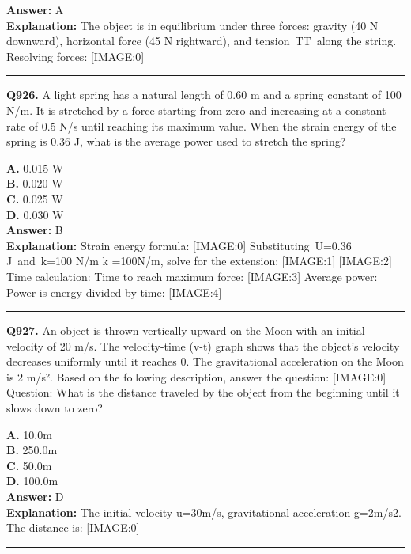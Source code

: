 \documentclass[12pt]{article}
\begin{document}
\textbf{Answer:} A \\
\textbf{Explanation:} The object is in equilibrium under three forces: gravity (40 N downward), horizontal force (45 N rightward), and tension TT along the string. Resolving forces:
[IMAGE:0]

\hrule
\vspace{1em}


\noindent
\textbf{Q926.} A light spring has a natural length of 0.60 m and a spring constant of 100 N/m. It is stretched by a force starting from zero and increasing at a constant rate of 0.5 N/s until reaching its maximum value. When the strain energy of the spring is 0.36 J, what is the average power used to stretch the spring?



\textbf{A.} 0.015 W \\
\textbf{B.} 0.020 W \\
\textbf{C.} 0.025 W \\
\textbf{D.} 0.030 W \\

\textbf{Answer:} B \\
\textbf{Explanation:} Strain energy formula:
[IMAGE:0]
Substituting U=0.36
J and k=100
N/m
k
=100N/m, solve for the extension:
[IMAGE:1]
[IMAGE:2]
Time calculation: Time to reach maximum force:
[IMAGE:3]
Average power: Power is energy divided by time:
[IMAGE:4]

\hrule
\vspace{1em}


\noindent
\textbf{Q927.} An object is thrown vertically upward on the Moon with an initial velocity of 20 m/s. The velocity-time (v-t) graph shows that the object's velocity decreases uniformly until it reaches 0. The gravitational acceleration on the Moon is 2 m/s². Based on the following description, answer the question:
[IMAGE:0]
Question: What is the distance traveled by the object from the beginning until it slows down to zero?



\textbf{A.} 10.0m \\
\textbf{B.} 250.0m \\
\textbf{C.} 50.0m \\
\textbf{D.} 100.0m \\

\textbf{Answer:} D \\
\textbf{Explanation:} The initial velocity u=30m/s, gravitational acceleration g=2m/s2.
The distance is:
[IMAGE:0]

\hrule
\vspace{1em}
\end{document}
